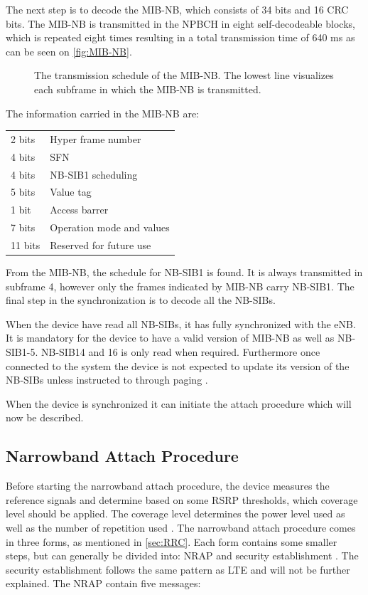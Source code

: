 The next step is to decode the \gls{MIB-NB}, which consists of 34 bits and 16 \gls{CRC} bits. The MIB-NB is transmitted in the NPBCH in eight self-decodeable blocks, which is repeated eight times resulting in a total transmission time of 640 ms as can be seen on \autoref{fig:MIB-NB}. 
 
\begin{figure}[H]
\centering

\caption{The transmission schedule of the MIB-NB. The lowest line visualizes each subframe in which the MIB-NB is transmitted.}
\label{fig:MIB-NB}
\end{figure}

The information carried in the \gls{MIB-NB} are:

\begin{tabular}{ll}\\
2 bits & Hyper frame number\\
4 bits & \gls{SFN}\\
4 bits & \gls{NB-SIB}1 scheduling\\
5 bits & Value tag\\
1 bit & Access barrer\\
7 bits & Operation mode and values\\
11 bits & Reserved for future use\\
\end{tabular}

From the \gls{MIB-NB}, the schedule for \gls{NB-SIB}1 is found. It is always transmitted in subframe 4, however only the frames indicated by \gls{MIB-NB} carry \gls{NB-SIB}1. The final step in the synchronization is to decode all the \gls{NB-SIB}s.

When the device have read all \gls{NB-SIB}s, it has fully synchronized with the \gls{eNB}. It is mandatory for the device to have a valid version of \gls{MIB-NB} as well as \gls{NB-SIB}1-5. \gls{NB-SIB}14 and 16 is only read when required. Furthermore once connected to the system the device is not expected to update its version of the \gls{NB-SIB}s unless instructed to through paging \citep{whitepaper}. 

When the device is synchronized it can initiate the attach procedure which will now be described. 




\subsection{Narrowband Attach Procedure} \label{sec:RAP}
Before starting the narrowband attach procedure, the device measures the reference signals and determine based on some \gls{RSRP} thresholds, which coverage level should be applied. The coverage level determines the power level used as well as the number of repetition used \citep{NB-IoT_Book}. The narrowband attach procedure comes in three forms, as mentioned in \autoref{sec:RRC}. Each form contains some smaller steps, but can generally be divided into: \gls{NRAP} and security establishment \citep{REL-13}. The security establishment follows the same pattern as LTE and will not be further explained. The \gls{NRAP} contain five messages:

